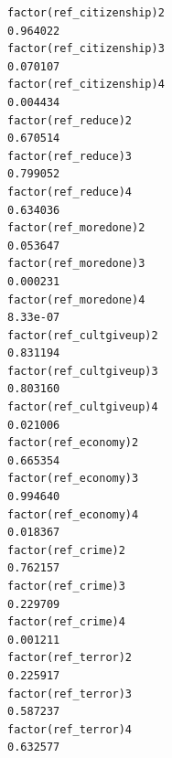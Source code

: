 \documentclass[
]{article}
\begin{document}
\begin{table}
\begin{minipage}[t]{\linewidth}
{\begin{verbatim}
factor(ref_citizenship)2                                                          0.964022
factor(ref_citizenship)3                                                          0.070107
factor(ref_citizenship)4                                                          0.004434
factor(ref_reduce)2                                                               0.670514
factor(ref_reduce)3                                                               0.799052
factor(ref_reduce)4                                                               0.634036
factor(ref_moredone)2                                                             0.053647
factor(ref_moredone)3                                                             0.000231
factor(ref_moredone)4                                                             8.33e-07
factor(ref_cultgiveup)2                                                           0.831194
factor(ref_cultgiveup)3                                                           0.803160
factor(ref_cultgiveup)4                                                           0.021006
factor(ref_economy)2                                                              0.665354
factor(ref_economy)3                                                              0.994640
factor(ref_economy)4                                                              0.018367
factor(ref_crime)2                                                                0.762157
factor(ref_crime)3                                                                0.229709
factor(ref_crime)4                                                                0.001211
factor(ref_terror)2                                                               0.225917
factor(ref_terror)3                                                               0.587237
factor(ref_terror)4                                                               0.632577
                                                                                     

\end{verbatim}}
\end{minipage}
\end{table}
\end{document}
